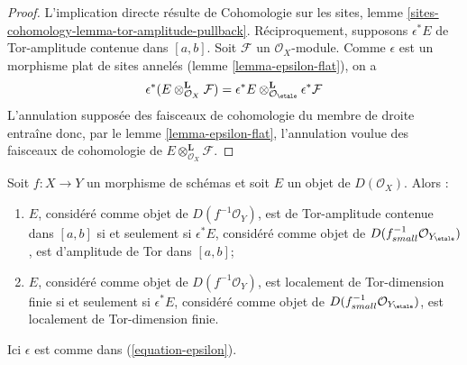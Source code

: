 \begin{proof}
L'implication directe r\'esulte de Cohomologie sur les sites, lemme
\ref{sites-cohomology-lemma-tor-amplitude-pullback}.
R\'eciproquement, supposons $\epsilon^*E$ de Tor-amplitude contenue dans
$[a,b]$.
Soit $\mathcal{F}$ un $\mathcal{O}_X$-module. Comme $\epsilon$ est un
morphisme plat de sites annel\'es (lemme \ref{lemma-epsilon-flat}), on a
$$
\epsilon^*(E \otimes^\mathbf{L}_{\mathcal{O}_X} \mathcal{F})
=
\epsilon^*E
\otimes^\mathbf{L}_{\mathcal{O}_\etale}
\epsilon^*\mathcal{F}
$$
L'annulation suppos\'ee des faisceaux de cohomologie du membre de droite
entra\^ine donc, par le lemme \ref{lemma-epsilon-flat}, l'annulation voulue
des faisceaux de cohomologie de
$E \otimes^\mathbf{L}_{\mathcal{O}_X} \mathcal{F}$.
\end{proof}

\begin{lemma}
\label{lemma-tor-dimension-rel}
Soit $f : X \to Y$ un morphisme de sch\'emas et soit $E$ un objet de
$D(\mathcal{O}_X)$. Alors :
\begin{enumerate}
\item $E$, consid\'er\'e comme objet de $D(f^{-1}\mathcal{O}_Y)$, est
de Tor-amplitude contenue dans $[a,b]$ si et seulement si $\epsilon^*E$,
consid\'er\'e
comme objet de $D(f_{small}^{-1}\mathcal{O}_{Y_\etale})$, est d'amplitude de
Tor dans $[a,b]$;
\item $E$, consid\'er\'e comme objet de $D(f^{-1}\mathcal{O}_Y)$, est
localement de Tor-dimension finie si et seulement si $\epsilon^*E$,
consid\'er\'e comme objet de
$D(f_{small}^{-1}\mathcal{O}_{Y_\etale})$, est localement de Tor-dimension
finie.
\end{enumerate}
Ici $\epsilon$ est comme dans (\ref{equation-epsilon}).
\end{lemma}

